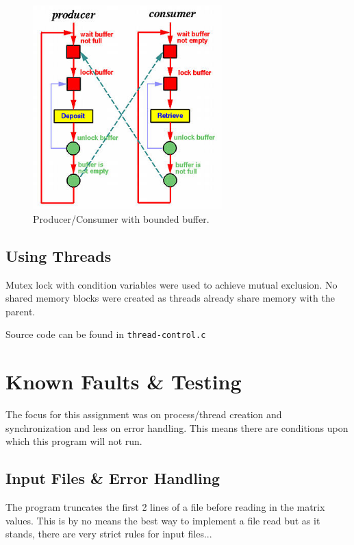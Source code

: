 \documentclass[titlepage]{article}
\begin{document}
\begin{figure}[ht]
\begin{center}
\includegraphics[width=0.65\textwidth]{Prod-Cons} %
\caption{Producer/Consumer with bounded buffer.}
\end{center}
\end{figure}

\subsection{Using Threads}
Mutex lock with condition variables were used to achieve mutual exclusion. No 
shared memory blocks were created as threads already share memory with the 
parent. 
\par
Source code can be found in \texttt{thread-control.c}
 
\section{Known Faults \& Testing}
The focus for this assignment was on process/thread creation and 
synchronization and less on error handling. This means there are conditions 
upon which this program will not run. 

\subsection{Input Files \& Error Handling}
The program truncates the first 2 lines 
of a file before reading in the matrix values. This is by no means the best 
way to implement a file read but as it stands, there are very strict rules for 
input files...
\end{document}

